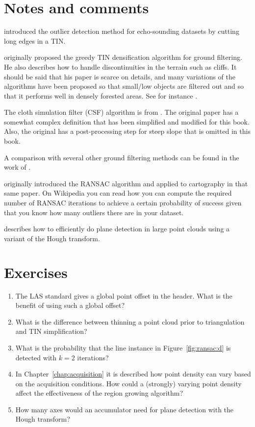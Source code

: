 %
\section{Notes and comments}

\citet{Arge10} introduced the outlier detection method for echo-sounding datasets by cutting long edges in a TIN\@.

\citet{Axelsson00} originally proposed the greedy TIN densification algorithm for ground filtering.
He also describes how to handle discontinuities in the terrain such as cliffs.
It should be said that his paper is scarce on details, and many variations of the algorithms have been proposed so that small/low objects are filtered out and so that it performs well in densely forested areas.
See for instance \citet{Lin14}. 

The cloth simulation filter (CSF) algorithm is from \citet{Zhang16}.
The original paper has a somewhat complex definition that has been simplified and modified for this book.
Also, the original has a post-processing step for steep slope that is omitted in this book.

A comparison with several other ground filtering methods can be found in the work of \citet{Meng10}.

\citet{Fischler81} originally introduced the RANSAC algorithm and applied to cartography in that same paper. On Wikipedia you can read how you can compute the required number of RANSAC iterations to achieve a certain probability of success given that you know how many outliers there are in your dataset.

\citet{Limberger15} describes how to efficiently do plane detection in large point clouds using a variant of the Hough transform.

%
\section{Exercises}

\begin{enumerate}
   \item The LAS standard gives a global point offset in the header. What is the benefit of using such a global offset?
   \item What is the difference between thinning a point cloud prior to triangulation and TIN simplification?
  \item What is the probability that the line instance in Figure~\ref{fig:ransac:d} is detected with $k=2$ iterations?
  \item In Chapter~\ref{chap:acquisition} it is described how point density can vary based on the acquisition conditions. How could a (strongly) varying point density affect the effectiveness of the region growing algorithm?
  \item How many axes would an accumulator need for plane detection with the Hough transform?

\end{enumerate}
